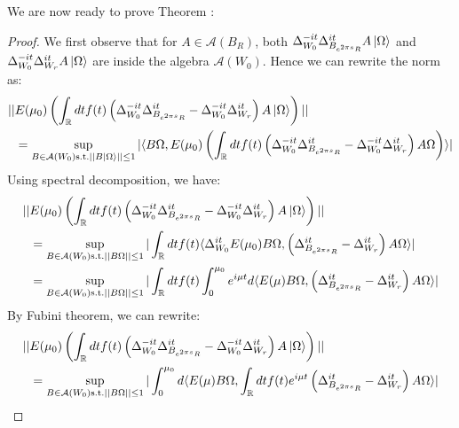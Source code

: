 \documentclass[a4paper,11pt]{article}
\theoremstyle{definition}
\newcommand{\lb}{\left(}
\newcommand{\rb}{\right)}
\begin{document}
We are now ready to prove Theorem \label{theorem:mainresult}:
\begin{proof}
    We first observe that for $A\in\mathcal{A}(B_R)$, both $\Delta^{-it}_{W_0}\Delta^{it}_{B_{e^{2\pi s}R}}A\ket{\Omega}$ and $\Delta^{-it}_{W_0}\Delta^{it}_{W_r}A\ket{\Omega}$ are inside the algebra $\mathcal{A}(W_0)$. Hence we can rewrite the norm as:
    \begin{align}
        \begin{split}
            ||&E(\mu_0)\lb\int_\mathbb{R} dt f(t)\lb \Delta_{W_0}^{-it}\Delta_{B_{e^{2\pi s}R}}^{it} - \Delta_{W_0}^{-it}\Delta_{W_r}^{it} \rb A\ket{\Omega}\rb|| \\&= \sup_{B\in\mathcal{A}(W_0)\text{s.t.}||B\ket{\Omega}||\leq 1}|\langle  B\Omega, E(\mu_0)\lb\int_\mathbb{R} dt f(t)\lb \Delta^{-it}_{W_0}\Delta^{it}_{B_{e^{2\pi s}R}} - \Delta^{-it}_{W_0}\Delta^{it}_{W_r}\rb A\Omega\rb\rangle|
        \end{split}
    \end{align}
    Using spectral decomposition, we have:
    \begin{align}
        \begin{split}
            ||&E(\mu_0)\lb\int_\mathbb{R} dt f(t)\lb \Delta_{W_0}^{-it}\Delta_{B_{e^{2\pi s}R}}^{it} - \Delta_{W_0}^{-it}\Delta_{W_r}^{it} \rb A\ket{\Omega}\rb||
            \\&
            =\sup_{B\in\mathcal{A}(W_0)\text{s.t.}||B\Omega||\leq 1}|\int_\mathbb{R} dt f(t)\langle \Delta_{W_0}^{it}E(\mu_0)B\Omega, \lb\Delta^{it}_{B_{e^{2\pi s}R}} - \Delta^{it}_{W_r}\rb A\Omega\rangle|
            \\&
            =\sup_{B\in\mathcal{A}(W_0)\text{s.t.}||B\Omega||\leq 1}|\int_\mathbb{R} dt f(t) \int_0^{\mu_0}e^{i\mu t}d\langle E(\mu)B\Omega, \lb\Delta^{it}_{B_{e^{2\pi s}R}} - \Delta^{it}_{W_r}\rb A\Omega\rangle|
        \end{split}
    \end{align}
    By Fubini theorem, we can rewrite:
    \begin{align}
        \begin{split}
            ||&E(\mu_0)\lb\int_\mathbb{R} dt f(t)\lb \Delta_{W_0}^{-it}\Delta_{B_{e^{2\pi s}R}}^{it} - \Delta_{W_0}^{-it}\Delta_{W_r}^{it} \rb A\ket{\Omega}\rb||
            \\&
            =\sup_{B\in\mathcal{A}(W_0)\text{s.t.}||B\Omega||\leq 1}|\int_0^{\mu_0} d\langle E(\mu)B\Omega, \int_\mathbb{R} dt f(t)e^{i\mu t}\lb\Delta_{B_{e^{2\pi s}R}}^{it} - \Delta_{W_r}^{it}\rb A\Omega\rangle|

\end{split}
\end{align}
\end{proof}
\end{document}
